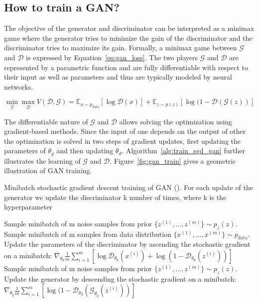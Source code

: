 \subsection{How to train a GAN?}
\label{subsec:train_gan}
The objective of the generator and discriminator can be interpreted as a minimax game where the generator tries to minimize the gain of the discriminator and the discriminator tries to maximize its gain. Formally, a minimax game between $\mathcal{G}$ and $\mathcal{D}$ is expressed by Equation~\ref{eq:gan_loss}. The two players $\mathcal{G}$ and $\mathcal{D}$ are represented by a parametric function and are fully differentiable with respect to their input as well as parameters and thus are typically modeled by neural networks.

\begin{equation}
    \label{eq:gan_loss}
    \min_{\mathcal{G}} \max_{\mathcal{D}} V(\mathcal{D}, \mathcal{G}) = \mathbb{E}_{x\sim p_\text{data}} [\log \mathcal{D}(x)] + \mathbb{E}_{z\sim p(z)} [\log (1 - \mathcal{D}(\mathcal{G}(z))]
\end{equation}

The differentiable nature of $\mathcal{G}$ and $\mathcal{D}$ allows solving the optimization using gradient-based methods. Since the input of one depends on the output of other the optimization is solved in two steps of gradient updates, first updating the parameters of $\theta_g$ and then updating $\theta_d$. Algorithm~\ref{alg:train_sgd_gan} further illustrates the learning of $\mathcal{G}$ and $\mathcal{D}$. Figure~\ref{fig:gan_train} gives a geometric illustration of GAN training.

\begin{algorithm}
    \caption[Minibatch training of a GAN]{Minibatch stochastic gradient descent training of GAN (\cite{goodfellow2014generative}). For each update of the generator  we update the discriminator k number of times, where k is the hyperparameter}
    \label{alg:train_sgd_gan}
    \begin{algorithmic}
            \State Sample minibatch of m noise samples from prior $\{z^{(1)},..., z^{(m)}\}\sim p_z(z)$.
            \State Sample minibatch of m samples from data distribution $\{x^{(1)},...,x^{(m)}\} \sim p_\text{data}$.
            \State Update the parameters of the discriminator by ascending the stochastic gradient on a minibatch:
            \State $\nabla_{\theta_d} \frac{1}{m} \sum_{i=1}^m [\log \mathcal{D}_{\theta_d}(x^{(i)}) 
             + \log (1 - \mathcal{D}_{\theta_d}(z^{(i)}) )]$
        \EndFor
        \State Sample minibatch of m noise samples from prior $\{z^{(1)},..., z^{(m)}\}\sim p_z(z)$.
        \State Update the generator by descending the stochastic gradient on a minibatch:
        \State $\nabla_{\theta_g} \frac{1}{m}  \sum_{i=1}^m [ \log (1 - \mathcal{D}_{\theta_d}(\mathcal{G}_{\theta_g}(z^{(i)}) )]$
        \EndFor
    \end{algorithmic}
\end{algorithm}

